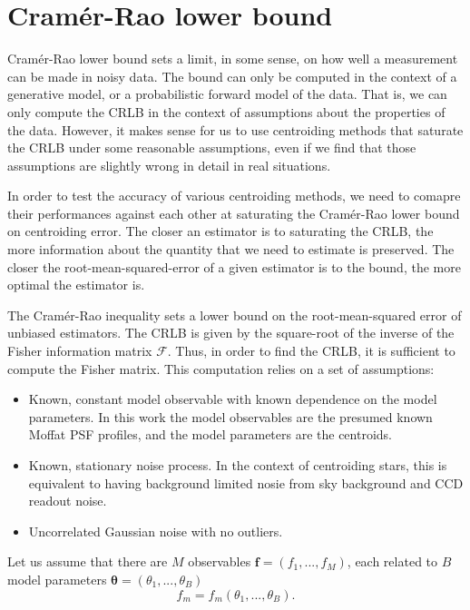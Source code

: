 \documentclass[12pt, preprint]{aastex}
\newcommand{\beq}{\begin{equation}}
\newcommand{\eeq}{\end{equation}}
\begin{document}

\section{Cram\'{e}r-Rao lower bound}\label{sec:CRLB}

Cram\'{e}r-Rao lower bound sets a limit, in some sense, on how well a measurement 
can be made in noisy data.  The bound can only be computed in the context of a 
generative model, or a probabilistic forward model of the data.  That is, we can 
only compute the CRLB in the context of assumptions about the properties of the data. 
However, it makes sense for us to use centroiding methods that saturate the CRLB under 
some reasonable assumptions, even if we find that those assumptions are slightly wrong 
in detail in real situations.

In order to test the accuracy of various centroiding methods, we need to comapre their 
performances against each other at saturating the Cram\'{e}r-Rao lower bound on centroiding error. 
The closer an estimator is to saturating the CRLB, the more information about the quantity that we 
need to estimate is preserved. The closer the root-mean-squared-error of a given estimator is to the bound, 
the more optimal the estimator is. 

The Cram\'{e}r-Rao inequality \citep{cramer} sets a lower bound on the 
root-mean-squared error of unbiased estimators. The CRLB is given by the square-root of the inverse of 
the Fisher information matrix $\mathcal{F}$. Thus, in order to find the CRLB,
 it is sufficient to compute the Fisher matrix. This computation relies on a set of assumptions:

\begin{itemize}
  \item Known, constant model observable with known dependence on the model parameters. 
        In this work the model observables are the presumed known Moffat PSF profiles, 
        and the model parameters are the centroids. 
  \item Known, stationary noise process. In the context of centroiding stars, this is equivalent to 
        having background limited nosie from sky background and CCD readout noise.
  \item Uncorrelated Gaussian noise with no outliers. 
\end{itemize}
 

Let us assume that there are $M$ observables $\mathbf{f} = (f_{1}, ... , f_{M})$, each
related to $B$ model parameters $\boldsymbol{\mathbf{\theta}} = (\theta_{1} , ... , \theta_{B})$ 
\beq
f_{m} = f_{m}(\theta_{1} , ... , \theta_{B}).
\label{genmodel}
\eeq
\end{document}
